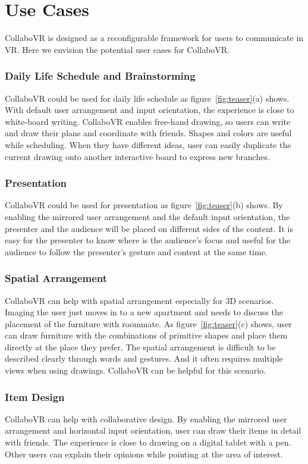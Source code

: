 \documentclass{sigchi}
\begin{document}
\section{Use Cases}
CollaboVR is designed as a reconfigurable framework for users to communicate in VR. Here we envision the potential user cases for CollaboVR.

\subsubsection{Daily Life Schedule and Brainstorming}
CollaboVR could be used for daily life schedule as figure~\ref{fig:teaser}(a) shows. With default user arrangement and input orientation, the experience is close to white-board writing. CollaboVR enables free-hand drawing, so users can write and draw their plans and coordinate with friends. Shapes and colors are useful while scheduling. When they have different ideas, user can easily duplicate the current drawing onto another interactive board to express new branches.

\subsubsection{Presentation}
CollaboVR could be used for presentation as figure~\ref{fig:teaser}(b) shows. By enabling the mirrored user arrangement and the default input orientation, the presenter and the audience will be placed on different sides of the content. It is easy for the presenter to know where is the audience's focus and useful for the audience to follow the presenter's gesture and content at the same time.

\subsubsection{Spatial Arrangement}
CollaboVR can help with spatial arrangement especially for 3D scenarios. Imaging the user just moves in to a new apartment and needs to discuss the placement of the furniture with roommate. As figure~\ref{fig:teaser}(c) shows, user can draw furniture with the combinations of primitive shapes and place them directly at the place they prefer. The spatial arrangement is difficult to be described clearly through words and gestures. And it often requires multiple views when using drawings. CollaboVR can be helpful for this scenario.

\subsubsection{Item Design}
CollaboVR can help with collaborative design. By enabling the mirrored user arrangement and horizontal input orientation, user can draw their items in detail with friends. The experience is close to drawing on a digital tablet with a pen. Other users can explain their opinions while pointing at the area of interest.
\end{document}
